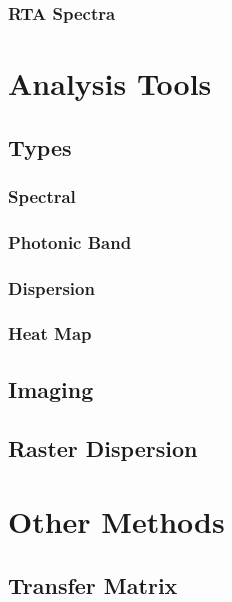 \documentclass[./JimHeneghanDissertation.tex]{subfiles}
\begin{document}
				\subsubsection{RTA Spectra}

		\section{Analysis Tools}
			\subsection{Types}
				\subsubsection{Spectral}
				\subsubsection{Photonic Band}
				\subsubsection{Dispersion}
				\subsubsection{Heat Map}
			\subsection{Imaging}
			\subsection{Raster Dispersion}
		\section{Other Methods}
			\subsection{Transfer Matrix}
\end{document}
